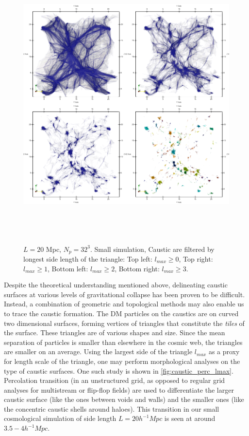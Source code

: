 \begin{figure} 
\centering\includegraphics[height=15cm]{Chapter2/Plots/caustic_connectivity.png} 
\caption{$L=20$ Mpc, $N_p = 32^3$. Small simulation, Caustic are filtered by longest side length of the triangle: Top left: $ l_{max} \geq 0$, Top right: $ l_{max} \geq 1$, Bottom left: $ l_{max} \geq 2$, Bottom right: $ l_{max} \geq 3$. }
\label{fig:caustic_lmax}
\end{figure}

Despite the theoretical understanding mentioned above, delineating caustic surfaces at various levels of gravitational collapse has been proven to be difficult. Instead, a combination of geometric and topological methods may also enable us to trace the caustic formation. The DM particles on the caustics are on curved two dimensional surfaces, forming vertices of triangles that constitute the {\it tiles} of the surface. These triangles are of various shapes and size. Since the mean separation of particles is smaller than elsewhere in the cosmic web, the triangles are smaller on an average. Using the largest side of the triangle $l_{max}$ as a proxy for length scale of the triangle, one may perform morphological analyses on the type of caustic surfaces. One such study is shown in \autoref{fig:caustic_perc_lmax}. Percolation transition (in an unstructured grid, as opposed to regular grid analyses for multistream or flip-flop fields) are used to differentiate the larger caustic surface (like the ones between voids and walls) and the smaller ones (like the concentric caustic shells around haloes). This transition in our small cosmological simulation of side length $L = 20 h^{-1} Mpc$ is seen at around $3.5-4 h^{-1} Mpc$. 


